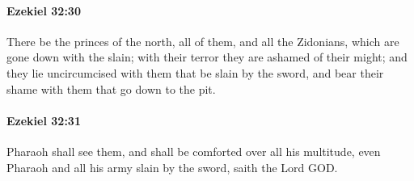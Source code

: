 		\paragraph{Ezekiel 32:30} %
			\label{EZEKIEL-32-30}

			There be the princes of the north, all of them, and all the Zidonians, which are gone down with the slain; with their terror they are ashamed of their might; and they lie uncircumcised with them that be slain by the sword, and bear their shame with them that go down to the pit.


		\paragraph{Ezekiel 32:31} %
			\label{EZEKIEL-32-31}

			Pharaoh shall see them, and shall be comforted over all his multitude, even Pharaoh and all his army slain by the sword, saith the Lord GOD.

